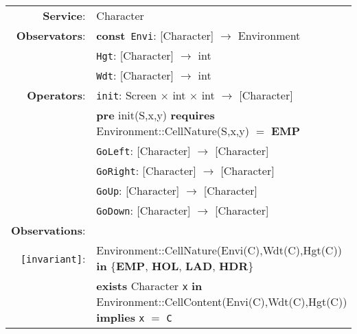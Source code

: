 \documentclass{article}
\begin{document}
\begin{tabular}{rl}
\textbf{Service}: & \textrm{Character}  \\
\textbf{Observators}: & \textbf{const}~\texttt{Envi}: \textrm{[Character]} $\rightarrow$ \textrm{Environment}  \\
 & \texttt{Hgt}: \textrm{[Character]} $\rightarrow$ \textrm{int}  \\
 & \texttt{Wdt}: \textrm{[Character]} $\rightarrow$ \textrm{int}  \\
\textbf{Operators}: & \texttt{init}: \textrm{Screen} $\times$ \textrm{int} $\times$ \textrm{int} $\rightarrow$ \textrm{[Character]} \\
& \quad\textbf{pre} \textrm{init(S,x,y)} \textbf{requires} \textrm{Environment::CellNature(S,x,y)} $=$ \textbf{EMP} \\
& \texttt{GoLeft}: \textrm{[Character]} $\rightarrow$ \textrm{[Character]} \\
 & \texttt{GoRight}: \textrm{[Character]} $\rightarrow$ \textrm{[Character]} \\
 & \texttt{GoUp}: \textrm{[Character]} $\rightarrow$ \textrm{[Character]} \\
 & \texttt{GoDown}: \textrm{[Character]} $\rightarrow$ \textrm{[Character]} \\
\textbf{Observations}: \\
\texttt{[invariant]}: & \textrm{Environment::CellNature(Envi(C),Wdt(C),Hgt(C))} \textbf{in} \{\textbf{EMP}, \textbf{HOL}, \textbf{LAD}, \textbf{HDR}\} \\
& \textbf{exists} \textrm{Character} \texttt{x} \textbf{in} \textrm{Environment::CellContent(Envi(C),Wdt(C),Hgt(C))} \textbf{implies} \texttt{x} $=$ \texttt{C}  \\



\end{tabular}
\end{document}
